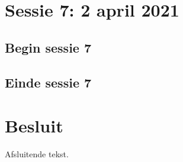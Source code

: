\documentclass[a4paper,twoside,kulak]{kulakreport} %
\begin{document}
\chapter{Sessie 7: 2 april 2021}
\section{Begin sessie 7}

\section{Einde sessie 7}












\chapter*{Besluit}
Afsluitende tekst.
\end{document}
